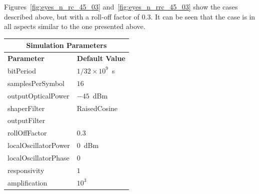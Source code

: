 \begin{refsection}
Figures~\ref{fig:eyes_n_rc_45_03} and~\ref{fig:eyes_n_rrc_45_03} show the
cases described above, but with a roll-off factor of 0.3. It can be seen that
the case is in all aspects similar to the one presented above.

\begin{table}[H]
	\centering
	
	\begin{tabular}{|l|l|}
		\hline
		\multicolumn{2}{|c|}{ \textbf{Simulation Parameters} } \\
		\hline
		\textbf{Parameter}     & \textbf{Default Value}                                     \\\hline
		bitPeriod              & $1/32\times10^9$~s														\\\hline
		samplesPerSymbol       & $16$                                                       \\\hline
		outputOpticalPower     & $-45$~dBm 													\\ \hline
		shaperFilter	       & RaisedCosine												\\ \hline
		outputFilter		   &                     										\\ \hline
		rollOffFactor		   & 0.3														\\ \hline
		localOscillatorPower   & $0$~dBm                                                    \\ \hline
		localOscillatorPhase   & $0$                                                        \\ \hline
		responsivity           & $1$                                                        \\ \hline
		amplification          & $10^3$                                                     \\ \hline

\end{tabular}
\end{table}
\end{refsection}
